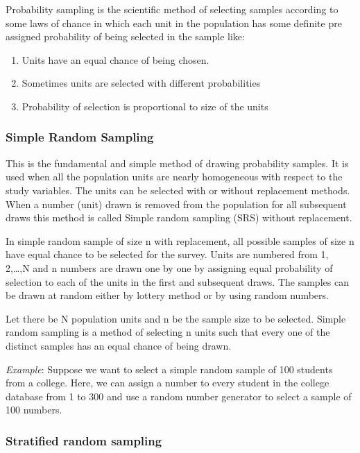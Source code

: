 \documentclass[
]{book}
\providecommand{\tightlist}{%
  \setlength{\itemsep}{0pt}\setlength{\parskip}{0pt}}
\begin{document}
Probability sampling is the scientific method of selecting samples according to some laws of chance in which each unit in the population has some definite pre assigned probability of being selected in the sample like:

\begin{enumerate}
\def\labelenumi{\arabic{enumi}.}
\tightlist
\item
  Units have an equal chance of being chosen.
\item
  Sometimes units are selected with different probabilities
\item
  Probability of selection is proportional to size of the units
\end{enumerate}

\hypertarget{simple-random-sampling}{%
\subsubsection{Simple Random Sampling}\label{simple-random-sampling}}

This is the fundamental and simple method of drawing probability samples. It is used when all the population units are nearly homogeneous with respect to the study variables. The units can be selected with or without replacement methods. When a number (unit) drawn is removed from the population for all subsequent draws this method is called Simple random sampling (SRS) without replacement.

In simple random sample of size n with replacement, all possible samples of size n have equal chance to be selected for the survey. Units are numbered from 1, 2,\ldots,N and n numbers are drawn one by one by assigning equal probability of selection to each of the units in the first and subsequent draws. The samples can be drawn at random either by lottery method or by using random numbers.

Let there be N population units and n be the sample size to be selected. Simple random sampling is a method of selecting n units such that every one of the distinct samples has an equal chance of being drawn.

\emph{Example}: Suppose we want to select a simple random sample of 100 students from a college. Here, we can assign a number to every student in the college database from 1 to 300 and use a random number generator to select a sample of 100 numbers.

\hypertarget{stratified-random-sampling}{%
\subsubsection{Stratified random sampling}\label{stratified-random-sampling}}
\end{document}

